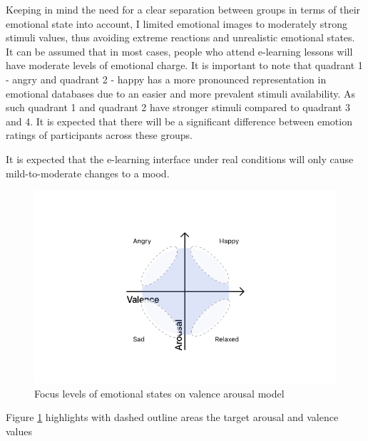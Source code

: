 Keeping in mind the need for a clear separation between groups in terms of their emotional state into account, I limited emotional images to moderately strong stimuli values, thus avoiding extreme reactions and unrealistic emotional states. It can be assumed that in most cases, people who attend e-learning lessons will have moderate levels of emotional charge. It is important to note that quadrant 1 - angry and quadrant 2 - happy has a more pronounced representation in emotional databases due to an easier and more prevalent stimuli availability. As such quadrant 1 and quadrant 2 have stronger stimuli compared to quadrant 3 and 4. It is expected that there will be a significant difference between emotion ratings of participants across these groups.


It is expected that the e-learning interface under real conditions will only cause mild-to-moderate changes to a mood.

\begin{figure}
	\centering
	\includegraphics[width=0.7\linewidth]{graphics/Valence-Arousal-Model-1.png}
	\caption{Focus levels of emotional states on valence arousal model}
	\label{fig:valence-arousal-model-2}
\end{figure}

Figure \ref{fig:valence-arousal-model-2} highlights with dashed outline areas the target arousal and valence values
